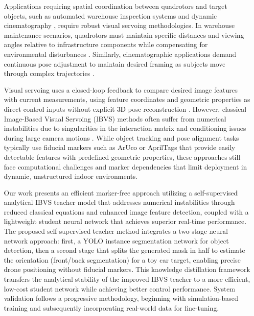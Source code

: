 \documentclass[10pt,twocolumn,letterpaper]{article}
\begin{document}
Applications requiring spatial coordination between quadrotors and target objects, such as automated warehouse inspection systems \cite{wawrla2019applications} and dynamic cinematography \cite{nageli2017real}, require robust visual servoing methodologies. In warehouse maintenance scenarios, quadrotors must maintain specific distances \cite{kouris2018learning} and viewing angles relative to infrastructure components while compensating for environmental disturbances \cite{wawrla2019applications}. Similarly, cinematographic applications demand continuous pose adjustment to maintain desired framing as subjects move through complex trajectories \cite{galvane2017automated}.

Visual servoing uses a closed-loop feedback to compare desired image features with current measurements, using feature coordinates and geometric properties as direct control inputs without explicit 3D pose reconstruction \cite{hutchinson1996tutorial, guenard2008practical}. However, classical Image-Based Visual Servoing (IBVS) methods often suffer from numerical instabilities due to singularities in the interaction matrix and conditioning issues during large camera motions \cite{corke1996visual}. While object tracking and pose alignment tasks typically use fiducial markers such as ArUco \cite{kalaitzakis2021fiducial, mraz2020using, cruz2024performance} or AprilTags \cite{olson2011apriltag, zhang2017autonomous, banik2025integrating} that provide easily detectable features with predefined geometric properties, these approaches still face computational challenges and marker dependencies that limit deployment in dynamic, unstructured indoor environments.

Our work presents an efficient marker-free approach utilizing a self-supervised analytical IBVS teacher model that addresses numerical instabilities through reduced classical equations and enhanced image feature detection, coupled with a lightweight student neural network that achieves superior real-time performance. The proposed self-supervised teacher method integrates a two-stage neural network approach: first, a YOLO \cite{redmon2016you, riftiarrasyid2024suitability, yang2025comparative} instance segmentation network for object detection, then a second stage that splits the generated mask in half to estimate the orientation (front/back segmentation) for a toy car target, enabling precise drone positioning without fiducial markers. This knowledge distillation framework transfers the analytical stability of the improved IBVS teacher to a more efficient, low-cost student network while achieving better control performance. System validation follows a progressive methodology, beginning with simulation-based training and subsequently incorporating real-world data for fine-tuning.
\end{document}

